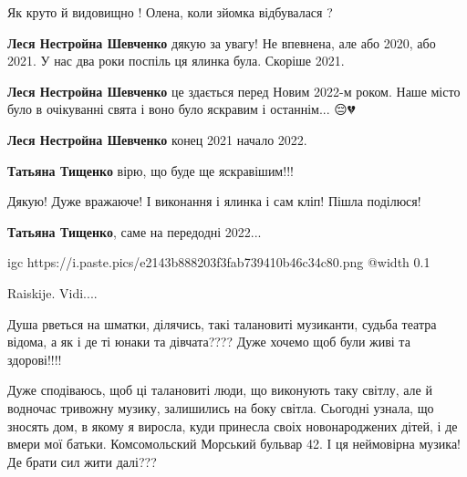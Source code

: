  
 
 
 
 

\qqSecCmt


Як круто й видовищно ! Олена, коли зйомка відбувалася ?

\begin{itemize} %
\textbf{Леся Нестройна Шевченко} дякую за увагу! Не впевнена, але або 2020, або 2021. У нас два роки поспіль ця ялинка була. Скоріше 2021.

\textbf{Леся Нестройна Шевченко} це здається перед Новим 2022-м роком. Наше місто було в очікуванні свята і воно було яскравим і останнім... 😔💔

\textbf{Леся Нестройна Шевченко} конец 2021 начало 2022.

\textbf{Татьяна Тищенко} вірю, що буде ще яскравішим!!!


Дякую! Дуже вражаюче! І виконання і ялинка і сам кліп! Пішла поділюся!

\textbf{Татьяна Тищенко}, саме на передодні 2022...

\end{itemize} %


\ifcmt
  igc https://i.paste.pics/e2143b888203f3fab739410b46c34c80.png
	@width 0.1
\fi


Raiskije. Vidi....


Душа рветься на шматки, ділячись, такі талановиті музиканти, судьба театра
відома, а як і де ті юнаки та дівчата???? Дуже хочемо щоб були живі та
здорові!!!!


Дуже сподіваюсь, щоб ці талановиті люди, що виконують таку світлу, але й
водночас тривожну музику, залишились на боку світла. Сьогодні узнала, що
зносять дом, в якому я виросла, куди принесла своіх новонароджених дітей, і де
вмери мої батьки. Комсомольский Морський бульвар 42. І ця неймовірна музика! Де
брати сил жити далі???

